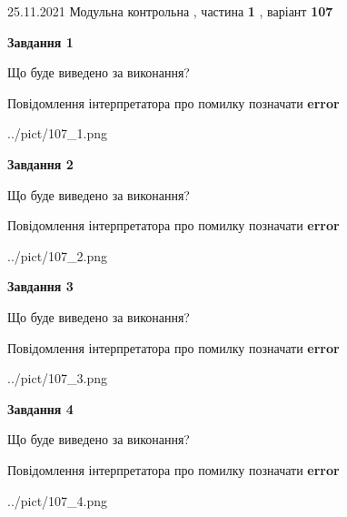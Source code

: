\documentclass[10pt, ukrainian]{article}
\begin{document}
{25.11.2021 Модульна контрольна , частина \textbf { 1 }, варіант  \No \textbf { 107 }\par}
{
\begin {large}

{\begin {center}\textbf{Завдання 1}\end {center}}\par
Що буде виведено за виконання? \par
Повідомлення інтерпретатора про помилку позначати \textbf{error}

\begin{center}
	{../pict/107_1.png}
\end{center}
\newpage

{\begin {center}\textbf{Завдання 2}\end {center}}\par
Що буде виведено за виконання? \par
Повідомлення інтерпретатора про помилку позначати \textbf{error}

\begin{center}
	{../pict/107_2.png}
\end{center}
\newpage

{\begin {center}\textbf{Завдання 3}\end {center}}\par
Що буде виведено за виконання? \par
Повідомлення інтерпретатора про помилку позначати \textbf{error}

\begin{center}
	{../pict/107_3.png}
\end{center}
\newpage

{\begin {center}\textbf{Завдання 4}\end {center}}\par
Що буде виведено за виконання? \par
Повідомлення інтерпретатора про помилку позначати \textbf{error}

\begin{center}
	{../pict/107_4.png}
\end{center}
\newpage


\end{large}}
\end{document}
